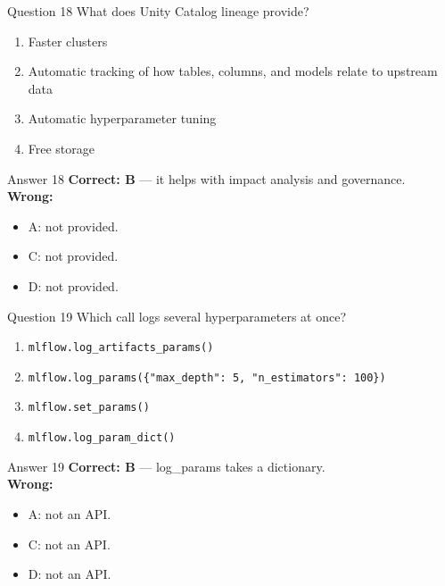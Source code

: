 \documentclass[aspectratio=169,11pt]{beamer}
\begin{document}
\begin{frame}{Question 18}
What does Unity Catalog lineage provide?
\begin{enumerate}[label=\Alph*.]
\item Faster clusters
\item Automatic tracking of how tables, columns, and models relate to upstream data
\item Automatic hyperparameter tuning
\item Free storage
\end{enumerate}
\end{frame}
\begin{frame}{Answer 18}
\textbf{Correct: B} --- it helps with impact analysis and governance.\\
\vspace{0.5em}
\textbf{Wrong:}
\begin{itemize}
\item A: not provided.
\item C: not provided.
\item D: not provided.
\end{itemize}
\end{frame}

\begin{frame}{Question 19}
Which call logs several hyperparameters at once?
\begin{enumerate}[label=\Alph*.]
\item \texttt{mlflow.log\_artifacts\_params()}
\item \texttt{mlflow.log\_params(\{"max\_depth": 5, "n\_estimators": 100\})}
\item \texttt{mlflow.set\_params()}
\item \texttt{mlflow.log\_param\_dict()}
\end{enumerate}
\end{frame}
\begin{frame}{Answer 19}
\textbf{Correct: B} --- log\_params takes a dictionary.\\
\vspace{0.5em}
\textbf{Wrong:}
\begin{itemize}
\item A: not an API.
\item C: not an API.
\item D: not an API.
\end{itemize}
\end{frame}
\end{document}
